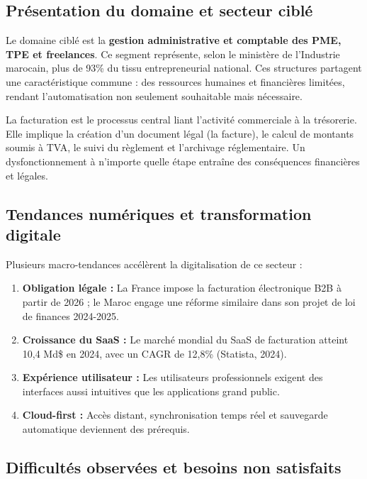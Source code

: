 \documentclass[12pt,a4paper]{report}
\begin{document}
\subsection{Présentation du domaine et secteur ciblé}

Le domaine ciblé est la \textbf{gestion administrative et comptable des PME, TPE et freelances}. Ce segment représente, selon le ministère de l'Industrie marocain, plus de 93\% du tissu entrepreneurial national. Ces structures partagent une caractéristique commune : des ressources humaines et financières limitées, rendant l'automatisation non seulement souhaitable mais nécessaire.

La facturation est le processus central liant l'activité commerciale à la trésorerie. Elle implique la création d'un document légal (la facture), le calcul de montants soumis à TVA, le suivi du règlement et l'archivage réglementaire. Un dysfonctionnement à n'importe quelle étape entraîne des conséquences financières et légales.

\subsection{Tendances numériques et transformation digitale}

Plusieurs macro-tendances accélèrent la digitalisation de ce secteur :

\begin{enumerate}
    \item \textbf{Obligation légale :} La France impose la facturation électronique B2B à partir de 2026 ; le Maroc engage une réforme similaire dans son projet de loi de finances 2024-2025.
    \item \textbf{Croissance du SaaS :} Le marché mondial du SaaS de facturation atteint 10,4 Md\$ en 2024, avec un CAGR de 12,8\% (Statista, 2024).
    \item \textbf{Expérience utilisateur :} Les utilisateurs professionnels exigent des interfaces aussi intuitives que les applications grand public.
    \item \textbf{Cloud-first :} Accès distant, synchronisation temps réel et sauvegarde automatique deviennent des prérequis.
\end{enumerate}

\subsection{Difficultés observées et besoins non satisfaits}
\end{document}
